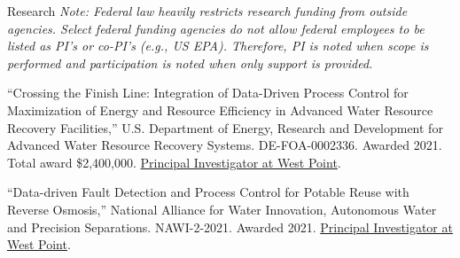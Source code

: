 \documentclass{resume} %
\begin{document}

\begin{rSection}{Research}
\emph{Note: Federal law heavily restricts research funding from outside agencies. Select federal funding agencies do not allow federal employees to be listed as PI's or co-PI's (e.g., US EPA). Therefore, PI is noted when scope is performed and participation is noted when only support is provided.}

``Crossing the Finish Line: Integration of Data-Driven Process Control for Maximization of Energy and Resource Efficiency in Advanced Water Resource Recovery Facilities,'' U.S. Department of Energy, Research and Development for Advanced Water Resource Recovery Systems. DE-FOA-0002336. Awarded 2021. Total award \$2,400,000. \ul{Principal Investigator at West Point}.

``Data-driven Fault Detection and Process Control for Potable Reuse with Reverse Osmosis,'' National Alliance for Water Innovation, Autonomous Water and Precision Separations. NAWI-2-2021. Awarded 2021. \ul{Principal Investigator at West Point}.
\end{rSection}


\end{document}

